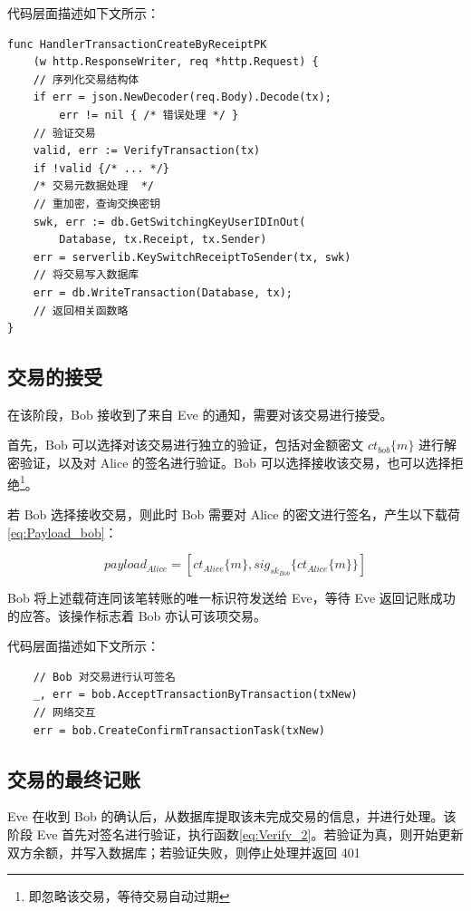 代码层面描述如下文所示：

\begin{verbatim}
func HandlerTransactionCreateByReceiptPK
    (w http.ResponseWriter, req *http.Request) {
    // 序列化交易结构体
    if err = json.NewDecoder(req.Body).Decode(tx); 
        err != nil { /* 错误处理 */ }
    // 验证交易
    valid, err := VerifyTransaction(tx)
    if !valid {/* ... */}
    /* 交易元数据处理  */
    // 重加密，查询交换密钥
    swk, err := db.GetSwitchingKeyUserIDInOut(
        Database, tx.Receipt, tx.Sender)
    err = serverlib.KeySwitchReceiptToSender(tx, swk)
    // 将交易写入数据库
    err = db.WriteTransaction(Database, tx); 
    // 返回相关函数略
}
\end{verbatim}

\subsection{交易的接受}

在该阶段，Bob 接收到了来自 Eve 的通知，需要对该交易进行接受。

首先，Bob 可以选择对该交易进行独立的验证，包括对金额密文 $ct_{bob}\{m\}$ 进行解密验证，以及对 Alice 的签名进行验证。Bob 可以选择接收该交易，也可以选择拒绝\footnote{即忽略该交易，等待交易自动过期}。

若 Bob 选择接收交易，则此时 Bob 需要对 Alice 的密文进行签名，产生以下载荷\eqref{eq:Payload_bob}：

\begin{equation} \label{eq:Payload_bob}
    payload_{Alice} = [ct_{Alice}\{m\}, sig_{sk_{Bob}}\{ct_{Alice}\{m\}\}]
\end{equation}

Bob 将上述载荷连同该笔转账的唯一标识符发送给 Eve，等待 Eve 返回记账成功的应答。该操作标志着 Bob 亦认可该项交易。

代码层面描述如下文所示：

\begin{verbatim}
    // Bob 对交易进行认可签名
    _, err = bob.AcceptTransactionByTransaction(txNew)
    // 网络交互
    err = bob.CreateConfirmTransactionTask(txNew)
\end{verbatim}

\subsection{交易的最终记账}

Eve 在收到 Bob 的确认后，从数据库提取该未完成交易的信息，并进行处理。该阶段 Eve 首先对签名进行验证，执行函数\eqref{eq:Verify_2}。若验证为真，则开始更新双方余额，并写入数据库；若验证失败，则停止处理并返回 401 


